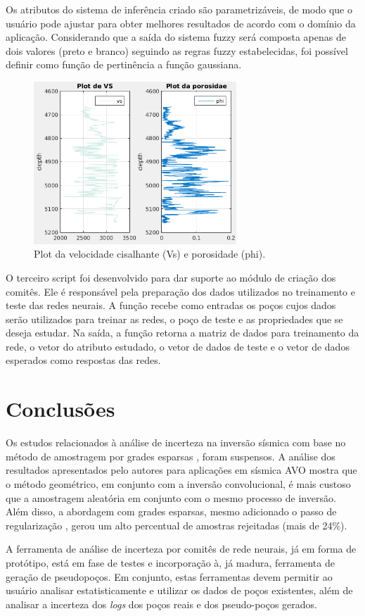 \documentclass[11pt]{article}
\begin{document}
Os atributos do sistema de inferência criado são parametrizáveis, de modo que o usuário pode ajustar para obter melhores resultados
de acordo com o domínio da aplicação. Considerando que a saída do sistema fuzzy será composta apenas de dois valores (preto e branco)
seguindo as regras fuzzy estabelecidas, foi possível definir como função de pertinência a função gaussiana.

\begin{figure}[!ht]
\centering
\includegraphics[width=3.0in]{plotvsphi}
\caption{Plot da velocidade cisalhante (Vs) e porosidade (phi).}
\label{fig_plot}
\end{figure}


O terceiro script foi desenvolvido para dar suporte ao módulo de criação dos comitês.
Ele é responsável pela preparação dos dados utilizados no treinamento e teste das redes neurais.
A função recebe como entradas os poços cujos dados serão utilizados para treinar as redes, o poço de teste e as propriedades que se deseja estudar.
Na saída, a função retorna a matriz de dados para treinamento da rede, o vetor do atributo estudado, o vetor de dados de teste  e o vetor de dados
esperados como respostas das redes.

\section{Conclusões}

Os estudos relacionados à análise de incerteza na inversão sísmica com base no método de amostragem por grades esparsas \cite{Tompkins2013} \cite{Tompkins15},
foram suspensos. A análise dos resultados apresentados pelo autores para aplicações em sísmica AVO mostra que o método geométrico, em conjunto
com a inversão convolucional, é mais custoso que a amostragem aleatória em conjunto com o mesmo processo de inversão. Além disso,
a abordagem com grades esparsas, mesmo adicionado o passo de regularização \cite{Tompkins15}, gerou um alto percentual de amostras rejeitadas (mais de 24\%).

A ferramenta de análise de incerteza por comitês de rede neurais, já em forma de protótipo, está em fase de testes e incorporação 
à, já madura, ferramenta de geração de pseudo\-poços. Em conjunto, estas ferramentas devem permitir
ao usuário analisar estatisticamente e utilizar os dados de poços existentes, além de analisar a incerteza dos \textit{logs} dos poços reais e dos pseudo-poços gerados.

 \nocite{*}

\begin{spacing}{1}
   
   
 \end{spacing}
\end{document}
